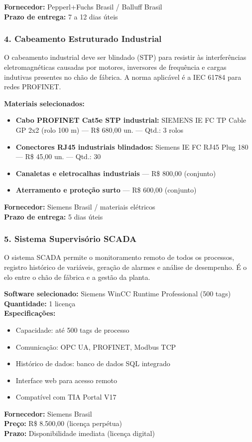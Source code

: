\documentclass[12pt,a4paper]{article}
\begin{document}
\textbf{Fornecedor:} Pepperl+Fuchs Brasil / Balluff Brasil\\
\textbf{Prazo de entrega:} 7 a 12 dias úteis

\subsubsection*{4. Cabeamento Estruturado Industrial}

O cabeamento industrial deve ser blindado (STP) para resistir às interferências
eletromagnéticas causadas por motores, inversores de frequência e cargas indutivas
presentes no chão de fábrica. A norma aplicável é a IEC 61784 para redes PROFINET.

\textbf{Materiais selecionados:}
\begin{itemize}[leftmargin=1.5cm, itemsep=4pt]
    \item \textbf{Cabo PROFINET Cat5e STP industrial:} SIEMENS IE FC TP Cable GP 2x2
    (rolo 100 m) --- R\$ 680,00 un. --- Qtd.: 3 rolos
    \item \textbf{Conectores RJ45 industriais blindados:} Siemens IE FC RJ45 Plug 180
    --- R\$ 45,00 un. --- Qtd.: 30
    \item \textbf{Canaletas e eletrocalhas industriais} --- R\$ 800,00 (conjunto)
    \item \textbf{Aterramento e proteção surto} --- R\$ 600,00 (conjunto)
\end{itemize}

\textbf{Fornecedor:} Siemens Brasil / materiais elétricos\\
\textbf{Prazo de entrega:} 5 dias úteis

\subsubsection*{5. Sistema Supervisório SCADA}

O sistema SCADA permite o monitoramento remoto de todos os processos, registro
histórico de variáveis, geração de alarmes e análise de desempenho. É o elo entre
o chão de fábrica e a gestão da planta.

\textbf{Software selecionado:} Siemens WinCC Runtime Professional (500 tags)\\
\textbf{Quantidade:} 1 licença\\
\textbf{Especificações:}
\begin{itemize}[leftmargin=1.5cm, itemsep=1pt]
    \item Capacidade: até 500 tags de processo
    \item Comunicação: OPC UA, PROFINET, Modbus TCP
    \item Histórico de dados: banco de dados SQL integrado
    \item Interface web para acesso remoto
    \item Compatível com TIA Portal V17
\end{itemize}
\textbf{Fornecedor:} Siemens Brasil\\
\textbf{Preço:} R\$ 8.500,00 (licença perpétua)\\
\textbf{Prazo:} Disponibilidade imediata (licença digital)
\end{document}

